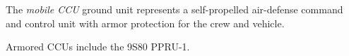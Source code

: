 
The \emph{mobile CCU} ground unit represents a self-propelled air-defense command and control unit with armor protection for the crew and vehicle. 

Armored CCUs include the 9S80 PPRU-1.
